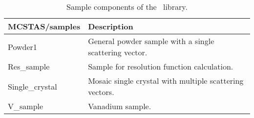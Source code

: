 \begin{table}
  \begin{center}
    {\let\my=\\
    \begin{tabular}{|p{}|p{}|}
      \hline
       MCSTAS/samples & Description \\ 
       \hline
       Powder1      &  General powder sample with a single
                scattering vector. \\

 Res\_sample   & Sample for resolution function
                calculation. \\

 Single\_crystal & Mosaic single crystal with multiple
                scattering vectors. \\

 V\_sample      & Vanadium sample.\\
      \hline
    \end{tabular}
    \caption{Sample components of the \MCS\ library.}
    \label{t:comp-samples}
    }
  \end{center}
\end{table}


